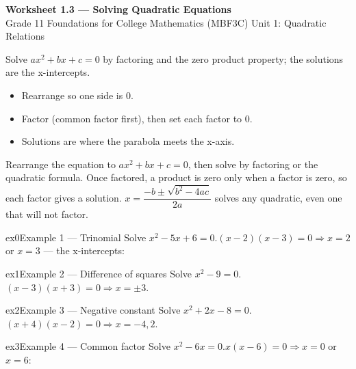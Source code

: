 \documentclass[11pt]{article}
\begin{document}
\begin{center}
{\LARGE\bfseries\color{titleblue}Worksheet 1.3 --- Solving Quadratic Equations}\\[2pt]
{\small Grade 11 Foundations for College Mathematics (MBF3C) \textperiodcentered{} Unit 1: Quadratic Relations}
\end{center}

\begin{ideabox}
Solve $ax^2+bx+c=0$ by factoring and the zero product property; the solutions are the x-intercepts.
\begin{itemize}[leftmargin=*,itemsep=2pt]
  \item Rearrange so one side is $0$.
  \item Factor (common factor first), then set each factor to $0$.
  \item Solutions are where the parabola meets the x-axis.
\end{itemize}
\end{ideabox}

\begin{learnbox}
Rearrange the equation to $ax^2+bx+c=0$, then solve by factoring or the quadratic formula.
Once factored, a product is zero only when a factor is zero, so each factor gives a solution.
$x=\dfrac{-b\pm\sqrt{b^2-4ac}}{2a}$ solves any quadratic, even one that will not factor.
\end{learnbox}


\begin{example}{ex0}{Example 1 --- Trinomial}
Solve $x^2-5x+6=0$.\soln $(x-2)(x-3)=0\Rightarrow x=2$ or $x=3$ — the x-intercepts:
\end{example}

\begin{example}{ex1}{Example 2 --- Difference of squares}
Solve $x^2-9=0$.\soln $(x-3)(x+3)=0\Rightarrow x=\pm3$.
\end{example}

\begin{example}{ex2}{Example 3 --- Negative constant}
Solve $x^2+2x-8=0$.\soln $(x+4)(x-2)=0\Rightarrow x=-4,2$.
\end{example}

\begin{example}{ex3}{Example 4 --- Common factor}
Solve $x^2-6x=0$.\soln $x(x-6)=0\Rightarrow x=0$ or $x=6$:
\end{example}
\end{document}
